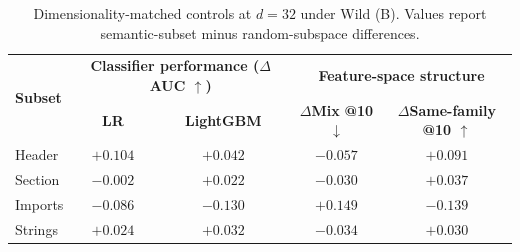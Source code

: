 \begin{table}[t]
\centering
\caption{Dimensionality-matched controls at $d=32$ under Wild (B).
Values report semantic-subset minus random-subspace differences.}
\label{tab:ra_q4_dim32_summary}

\scriptsize
\setlength{\tabcolsep}{3pt}
\begin{tabular}{@{}lcccc@{}}
\toprule
\multirow{2}{*}{\textbf{Subset}}
& \multicolumn{2}{c}{\textbf{Classifier performance ($\Delta$AUC $\uparrow$)}}
& \multicolumn{2}{c}{\textbf{Feature-space structure}} \\
\cmidrule(lr){2-3}
\cmidrule(lr){4-5}
& \textbf{LR}
& \textbf{LightGBM}
& \shortstack{\textbf{$\Delta$Mix}\\\textbf{@10 $\downarrow$}}
& \shortstack{\textbf{$\Delta$Same-family}\\\textbf{@10 $\uparrow$}} \\
\midrule
Header  & $+0.104$ & $+0.042$ & $-0.057$ & $+0.091$ \\
Section & $-0.002$ & $+0.022$ & $-0.030$ & $+0.037$ \\
Imports & $-0.086$ & $-0.130$ & $+0.149$ & $-0.139$ \\
Strings & $+0.024$ & $+0.032$ & $-0.034$ & $+0.030$ \\
\bottomrule
\end{tabular}
\end{table}